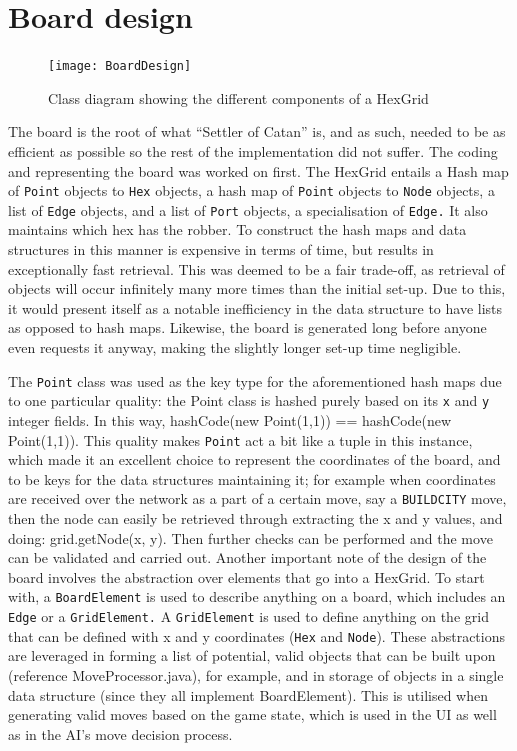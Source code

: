 \documentclass[a4paper,doc]{apa6}
\newcommand{\code}{\texttt}
\begin{document}
\section{Board design}
\begin{figure}[hbtp]
      \texttt{[image: BoardDesign]}
      \caption{Class diagram showing the different components of a HexGrid}
\end{figure}

The board is the root of what “Settler of Catan” is, and as such, needed to be as efficient as possible so the rest of the implementation did not suffer. The coding and representing the board was worked on first. The HexGrid entails a Hash map of \code{Point} objects to \code{Hex} objects, a hash map of \code{Point} objects to \code{Node} objects, a list of \code{Edge} objects, and a list of \code{Port} objects, a specialisation of \code{Edge.} It also maintains which hex has the robber. To construct the hash maps and data structures in this manner is expensive in terms of time, but results in exceptionally fast retrieval. This was deemed to be a fair trade-off, as retrieval of objects will occur infinitely many more times than the initial set-up. Due to this, it would present itself as a notable inefficiency in the data structure to have lists as opposed to hash maps. Likewise, the board is generated long before anyone even requests it anyway, making the slightly longer set-up time negligible.

The \code{Point} class was used as the key type for the aforementioned hash maps due to one particular quality: the Point class is hashed purely based on its \code{x} and \code{y} integer fields. In this way, hashCode(new Point(1,1)) == hashCode(new Point(1,1)). This quality makes \code{Point} act a bit like a tuple in this instance, which made it an excellent choice to represent the coordinates of the board, and to be keys for the data structures maintaining it; for example when coordinates are received over the network as a part of a certain move, say a \code{BUILDCITY} move, then the node can easily be retrieved through extracting the x and y values, and doing: grid.getNode(x, y). Then further checks can be performed and the move can be validated and carried out. Another important note of the design of the board involves the abstraction over elements that go into a HexGrid. To start with, a \code{BoardElement} is used to describe anything on a board, which includes an \code{Edge} or a \code{GridElement.} A \code{GridElement} is used to define anything on the grid that can be defined with x and y coordinates (\code{Hex} and \code{Node}). These abstractions are leveraged in forming a list of potential, valid objects that can be built upon (reference MoveProcessor.java), for example, and in storage of objects in a single data structure (since they all implement BoardElement). This is utilised when generating valid moves based on the game state, which is used in the UI as well as in the AI’s move decision process.
\end{document}

